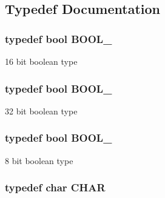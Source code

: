 \subsection{Typedef Documentation}
\hypertarget{group__LPC__Types__Public__Types_ga586a49bf86982ab05295515d1e4e35fe}{
\subsubsection[{B\-O\-O\-L\-\_\-16}]{\setlength{\rightskip}{0pt plus 5cm}typedef bool {\bf B\-O\-O\-L\-\_}}}\label{group__LPC__Types__Public__Types_ga586a49bf86982ab05295515d1e4e35fe}
16 bit boolean type \hypertarget{group__LPC__Types__Public__Types_gab02ba567b91b6b3d3c0c0209b2f577a0}{
\subsubsection[{B\-O\-O\-L\-\_\-32}]{\setlength{\rightskip}{0pt plus 5cm}typedef bool {\bf B\-O\-O\-L\-\_}}}\label{group__LPC__Types__Public__Types_gab02ba567b91b6b3d3c0c0209b2f577a0}
32 bit boolean type \hypertarget{group__LPC__Types__Public__Types_ga7cc7a8cc54a0a73fbfcc1eb0b792148d}{
\subsubsection[{B\-O\-O\-L\-\_\-8}]{\setlength{\rightskip}{0pt plus 5cm}typedef bool {\bf B\-O\-O\-L\-\_}}}\label{group__LPC__Types__Public__Types_ga7cc7a8cc54a0a73fbfcc1eb0b792148d}
8 bit boolean type \hypertarget{group__LPC__Types__Public__Types_gaebb9e13210d88d43e32e735ada43a425}{
\subsubsection[{C\-H\-A\-R}]{\setlength{\rightskip}{0pt plus 5cm}typedef char {\bf C\-H\-A\-R}}}\label{group__LPC__Types__Public__Types_gaebb9e13210d88d43e32e735ada43a425}
